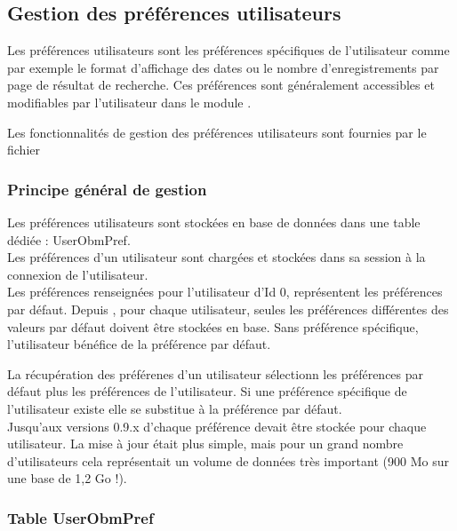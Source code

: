 
\subsection{Gestion des préférences utilisateurs}

Les préférences utilisateurs sont les préférences spécifiques de l'utilisateur comme par exemple le format d'affichage des dates ou le nombre d'enregistrements par page de résultat de recherche.
Ces préférences sont généralement accessibles et modifiables par l'utilisateur dans le module \settings.

Les fonctionnalités de gestion des préférences utilisateurs sont fournies par le fichier 

\subsubsection{Principe général de gestion}

Les préférences utilisateurs sont stockées en base de données dans une table dédiée : UserObmPref.\\

Les préférences d'un utilisateur sont chargées et stockées dans sa session à la connexion de l'utilisateur.\\

Les préférences renseignées pour l'utilisateur d'Id 0, représentent les préférences par défaut.
Depuis , pour chaque utilisateur, seules les préférences différentes des valeurs par défaut doivent être stockées en base. Sans préférence spécifique, l'utilisateur bénéfice de la préférence par défaut.

La récupération des préférenes d'un utilisateur sélectionn les préférences par défaut plus les préférences de l'utilisateur. Si une préférence spécifique de l'utilisateur existe elle se substitue à la préférence par défaut.\\

Jusqu'aux versions 0.9.x d'\obm chaque préférence devait être stockée pour chaque utilisateur. La mise à jour était plus simple, mais pour un grand nombre d'utilisateurs cela représentait un volume de données très important (900 Mo sur une base de 1,2 Go !).


\subsubsection{Table UserObmPref}


